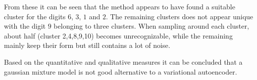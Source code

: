 From these it can be seen that the method appears to have found a suitable cluster for the digits $6$, $3$, $1$ and $2$. The remaining clusters does not appear unique with the digit $9$ belonging to three clusters. When sampling around each cluster, about half (cluster 2,4,8,9,10) becomes unrecognizable, while the remaining mainly keep their form but still contains a lot of noise.  

Based on the quantitative and qualitative measures it can be concluded that a gaussian mixture model is not good alternative to a variational autoencoder. 